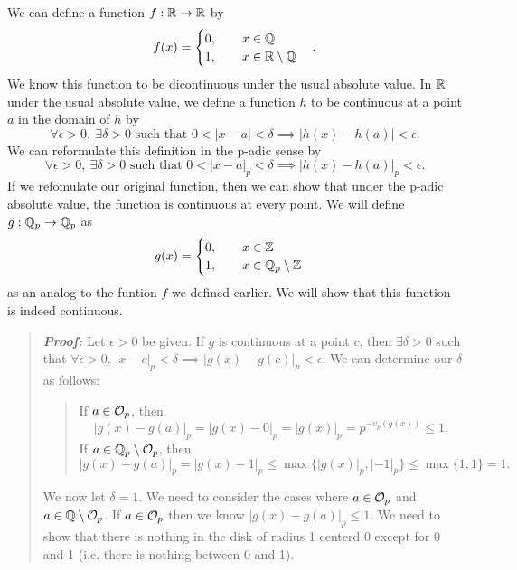 \documentclass{hw}
\begin{document}
    \noindent We can define a function $f:\mathbb{R}\to\mathbb{R}$ by
    \[
        f(x)=
        \begin{cases}
            0, \qquad x\in\mathbb{Q}\\
            1, \qquad x\in\mathbb{R}\setminus\mathbb{Q}
        \end{cases}.
    \]
    We know this function to be dicontinuous under the usual absolute value. In $\mathbb{R}$ under the usual absolute value,
    we define a function $h$ to be continuous at a point $a$ in the domain of $h$ by
    \[
        \forall\epsilon > 0,\ \exists\delta > 0 \text{ such that } 0<|x-a|<\delta\implies|h(x)-h(a)|<\epsilon.
    \]
    We can reformulate this definition in the p-adic sense by
    \[
        \forall\epsilon > 0,\ \exists\delta > 0 \text{ such that } 0<|x-a|_{p}<\delta\implies|h(x)-h(a)|_{p}<\epsilon.
    \]
    If we refomulate our original function, then we can show that under the p-adic absolute value, the function is
    continuous at every point. We will define $g:\mathbb{Q}_{p}\to\mathbb{Q}_{p}$ as
    \[
        g(x)=
        \begin{cases}
            0, \qquad x\in\mathbb{Z}\\
            1, \qquad x\in\mathbb{Q}_{p}\setminus\mathbb{Z}
        \end{cases}
    \]
    as an analog to the funtion $f$ we defined earlier. We will show that this function is indeed continuous.

    \begin{quote}
        \textit{\textbf{Proof:}} Let $\epsilon>0$ be given. If $g$ is continuous at a point $c$, then $\exists\delta>0$
        such that $\forall\epsilon >0$, $|x-c|_{p}<\delta\implies|g(x)-g(c)|_{p}<\epsilon$. We can determine our
        $\delta$ as follows:
        \begin{quote}
            If $a\in\mathcal{O}_{p}$, then
            \[
                |g(x)-g(a)|_{p}=|g(x)-0|_{p}=|g(x)|_{p}=p^{-v_{p}(g(x))}\leq 1.
            \]
            If $a\in\mathbb{Q}_{p}\setminus\mathcal{O}_{p}$, then
            \[
                |g(x)-g(a)|_{p}=|g(x)-1|_{p} \leq \max{\{|g(x)|_{p},|-1|_{p}\}} \leq \max{\{1,1\}} = 1.
            \]
        \end{quote}
        We now let $\delta=1$. We need to consider the cases where $a\in\mathcal{O}_{p}$ and $a\in\mathbb{Q}\setminus\mathcal{O}_{p}$. If
        $a\in\mathcal{O}_{p}$ then we know $|g(x)-g(a)|_{p}\leq 1$. We need to show that there is nothing in the disk of
        radius 1 centerd 0 except for 0 and 1 (i.e. there is nothing between 0 and 1).

    \end{quote}
\end{document}
